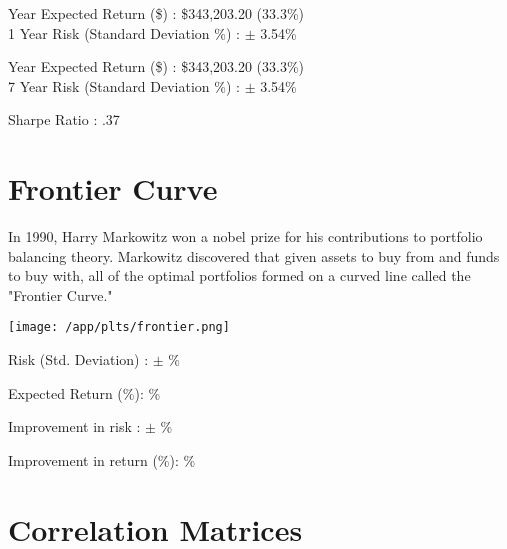 \documentclass{article}
\begin{document}
 Year Expected Return (\$) : \$343,203.20 (33.3\%)\\
1 Year Risk (Standard Deviation \%) : $\pm$ 3.54\%

 Year Expected Return (\$) : \$343,203.20 (33.3\%)\\
7 Year Risk (Standard Deviation \%) : $\pm$ 3.54\%

\noindent
Sharpe Ratio : .37


\newpage



\section{Frontier Curve}

In 1990, Harry Markowitz won a nobel prize for his contributions to portfolio balancing theory. Markowitz discovered that given assets to buy from and funds to buy with, all of the optimal portfolios formed on a curved line called the "Frontier Curve."

\vspace{2cm}

\hspace*{-1cm}\texttt{[image: /app/plts/frontier.png]}\par

\vspace{1cm}


Risk (Std. Deviation) : $\pm$ {} \%

Expected Return (\%): {} \%

Improvement in risk : $\pm$ {} \%

Improvement in return (\%): {} \%


\newpage

\section{Correlation Matrices}

\vspace{1cm}
\end{document}
